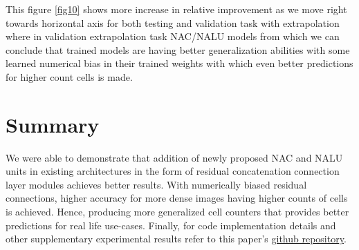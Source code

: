 \documentclass[conference]{IEEEtran}
\begin{document}
This figure \ref{fig10} shows more increase in relative improvement as we move right towards horizontal axis for both testing and validation task with extrapolation where in validation extrapolation task NAC/NALU models from which we can conclude that trained models are having better generalization abilities with some learned numerical bias in their trained weights with which even better predictions for higher count cells is made.

\section{Summary}
We were able to demonstrate that addition of newly proposed NAC and NALU units in existing architectures in the form of residual concatenation connection layer modules achieves better results. With numerically biased residual connections, higher accuracy for more dense images having higher counts of cells is achieved. Hence, producing more generalized cell counters that provides better predictions for real life use-cases. Finally, for code implementation details and other supplementary experimental results refer to this paper's \href{https://github.com/ashishrana160796/nalu-cell-counting}{github repository}.
\end{document}
